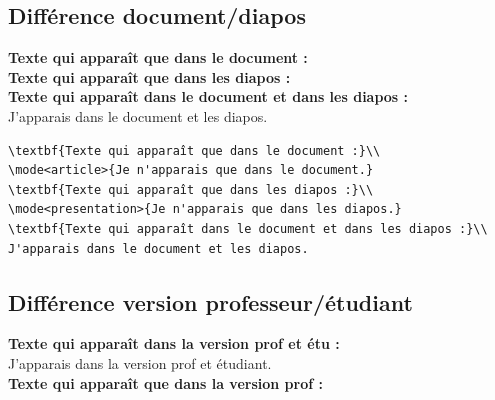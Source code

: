 \documentclass[b,e,cours]{D:/hubiC/GitHub/test_Baggio/paquets/classe_kara}
\begin{document}
\subsection{Différence document/diapos}
\begin{frame}[fragile]
\textbf{Texte qui apparaît que dans le document :}\\
\textbf{Texte qui apparaît que dans les diapos :}\\
\textbf{Texte qui apparaît dans le document et dans les diapos :}\\
J'apparais dans le document et les diapos.

\begin{verbatim}
\textbf{Texte qui apparaît que dans le document :}\\
\mode<article>{Je n'apparais que dans le document.}
\textbf{Texte qui apparaît que dans les diapos :}\\
\mode<presentation>{Je n'apparais que dans les diapos.}
\textbf{Texte qui apparaît dans le document et dans les diapos :}\\
J'apparais dans le document et les diapos.
\end{verbatim}
\end{frame}


\subsection{Différence version professeur/étudiant}

\begin{frame}
\textbf{Texte qui apparaît dans la version prof et étu :}\\
J'apparais dans la version prof et étudiant.\\

\textbf{Texte qui apparaît que dans la version prof :}\\
%
\end{frame}

%
%
\end{document}
